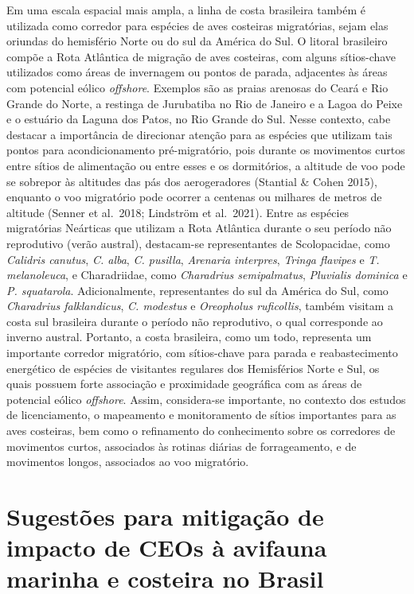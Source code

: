 \documentclass[
  oneside]{scrbook}
\begin{document}
Em uma escala espacial mais ampla, a linha de costa brasileira também é utilizada como corredor para espécies de aves costeiras migratórias, sejam elas oriundas do hemisfério Norte ou do sul da América do Sul. O litoral brasileiro compõe a Rota Atlântica de migração de aves costeiras, com alguns sítios-chave utilizados como áreas de invernagem ou pontos de parada, adjacentes às áreas com potencial eólico \emph{offshore}. Exemplos são as praias arenosas do Ceará e Rio Grande do Norte, a restinga de Jurubatiba no Rio de Janeiro e a Lagoa do Peixe e o estuário da Laguna dos Patos, no Rio Grande do Sul. Nesse contexto, cabe destacar a importância de direcionar atenção para as espécies que utilizam tais pontos para acondicionamento pré-migratório, pois durante os movimentos curtos entre sítios de alimentação ou entre esses e os dormitórios, a altitude de voo pode se sobrepor às altitudes das pás dos aerogeradores (Stantial \& Cohen 2015), enquanto o voo migratório pode ocorrer a centenas ou milhares de metros de altitude (Senner et al.~2018; Lindström et al.~2021). Entre as espécies migratórias Neárticas que utilizam a Rota Atlântica durante o seu período não reprodutivo (verão austral), destacam-se representantes de Scolopacidae, como \emph{Calidris canutus}, \emph{C. alba}, \emph{C. pusilla}, \emph{Arenaria interpres}, \emph{Tringa flavipes} e \emph{T. melanoleuca}, e Charadriidae, como \emph{Charadrius semipalmatus}, \emph{Pluvialis dominica} e \emph{P. squatarola}. Adicionalmente, representantes do sul da América do Sul, como \emph{Charadrius falklandicus}, \emph{C. modestus} e \emph{Oreopholus ruficollis}, também visitam a costa sul brasileira durante o período não reprodutivo, o qual corresponde ao inverno austral. Portanto, a costa brasileira, como um todo, representa um importante corredor migratório, com sítios-chave para parada e reabastecimento energético de espécies de visitantes regulares dos Hemisférios Norte e Sul, os quais possuem forte associação e proximidade geográfica com as áreas de potencial eólico \emph{offshore}. Assim, considera-se importante, no contexto dos estudos de licenciamento, o mapeamento e monitoramento de sítios importantes para as aves costeiras, bem como o refinamento do conhecimento sobre os corredores de movimentos curtos, associados às rotinas diárias de forrageamento, e de movimentos longos, associados ao voo migratório.

\hypertarget{sugestuxf5es-para-mitigauxe7uxe3o-de-impacto-de-ceos-uxe0-avifauna-marinha-e-costeira-no-brasil}{%
\section{Sugestões para mitigação de impacto de CEOs à avifauna marinha e costeira no Brasil}\label{sugestuxf5es-para-mitigauxe7uxe3o-de-impacto-de-ceos-uxe0-avifauna-marinha-e-costeira-no-brasil}}
\end{document}
